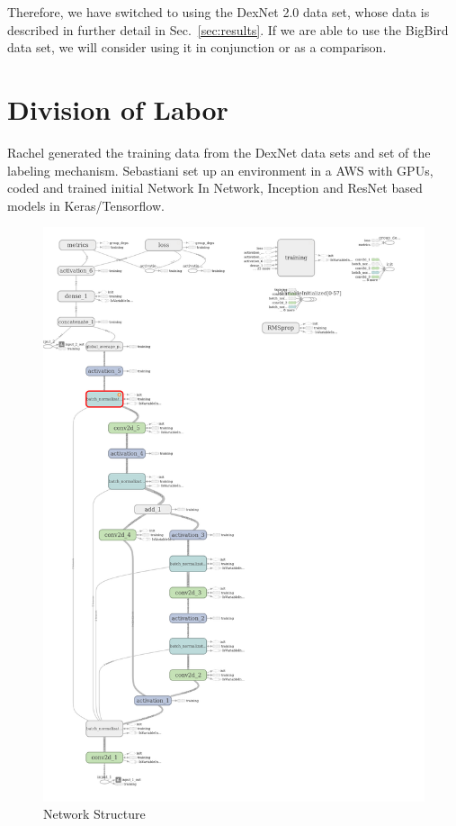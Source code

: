 \documentclass[letterpaper, 10 pt]{article}
\newcommand{\sref}[1]{Sec.~\ref{#1}} %
\begin{document}
Therefore, we have switched to using the DexNet 2.0 data set, whose data is described in further detail in \sref{sec:results}. 
If we are able to use the BigBird data set, we will consider using it in conjunction or as a comparison. 

\section{Division of Labor}

Rachel generated the training data from the DexNet data sets and set of the labeling mechanism. 
Sebastiani set up an environment in a AWS with GPUs, coded and trained initial Network In Network, Inception and ResNet based models in Keras/Tensorflow. 

\begin{figure}[t!]
    \centering
        \includegraphics[width=0.7\columnwidth]{figs/dex_resnet.png}
    \caption{Network Structure} \label{fig:network}
\end{figure}


{\footnotesize
    
}
\end{document}
